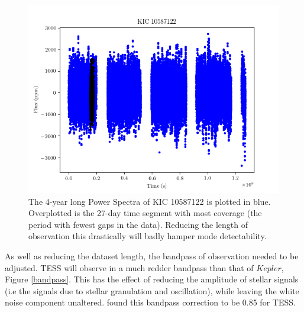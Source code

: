 \documentclass[a4paper,fleqn,usenatbib,useAMS]{mnras}
\newcommand{\kep}{\ensuremath{Kepler}\:}
\begin{document}
\begin{figure}
	\centering
	\includegraphics[scale=0.6]{timeseries_10587122}
	\caption{The 4-year long Power Spectra of KIC 10587122 is plotted in blue. Overplotted is the 27-day time segment with most coverage (the period with fewest gaps in the data). Reducing the length of observation this drastically will badly hamper mode detectability.}	
	\label{ts plot}
\end{figure} 

As well as reducing the dataset length, the bandpass of observation needed to be adjusted. TESS will observe in a much redder bandpass than that of \kep, Figure \ref{bandpass}. This has the effect of reducing the amplitude of stellar signals (i.e the signals due to stellar granulation and oscillation), while leaving the white noise component unaltered. \citet{campante_asteroseismic_2016} found this bandpass correction to be 0.85 for TESS.
\end{document}
